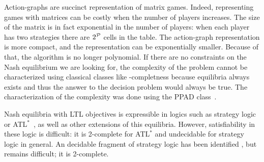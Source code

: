 Action-graphs are succinct representation of matrix games. Indeed,
representing games with matrices can be costly when the number of
players increases. The size of the matrix is in fact exponential in the
number of players: when each player has two strategies there are
\(2^{\mathcal{P}}\) cells in the table.
The action-graph representation is more compact, and the representation can be
exponentially smaller.
Because of that, the algorithm is no longer polynomial.
If there are no constraints on the Nash equilibrium we are looking for, the
complexity of the problem cannot be characterized using classical classes
like \NP-completness because equilibria always
exists and thus the answer to the decision problem would always be true.
The characterization of the complexity was done using the PPAD class~\cite{Daskalakis&Goldberg&Papadimitriou:2009}.


Nash equilibria with LTL objectives is expressible in logics such as
strategy logic \cite{Chatterjee&Henzinger&Piterman:2010} or ATL$^\ast$~\cite{Alur&Henzinger&Kupferman:2002}, as well as other extensions of this equilibria.
However, satisfiability in these logic is difficult: it is
2\EXP-complete for ATL$^\ast$ and undecidable for
strategy logic in general.
An decidable fragment of strategy logic has been identified \cite{Mogavero&Murano&Perelli&Vardi:2012},
but remains difficult; it is 2\EXP-complete.

